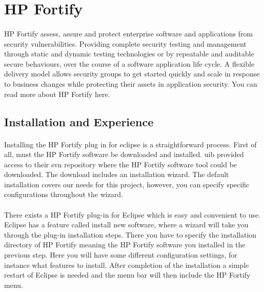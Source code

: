 \documentclass[11pt,english,a4paper]{report}
\begin{document}
\section{HP Fortify}
\paragraph{}
HP Fortify assess, assure and protect enterprise software and applications from security vulnerabilities.
Providing complete security testing and management through static and dynamic testing technologies or by repeatable and auditable secure behaviours, over the course of a software application life cycle. 
A flexible delivery model allows security groups to get started quickly and scale in response to business changes while protecting their assets in application security. 
You can read more about HP Fortify here. \cite{fortify-software-wiki, fortify-software-homepage-features} 

\subsection{Installation and Experience}
\paragraph{}
Installing the HP Fortify plug in for eclipse is a straightforward process. 
First of all, must the HP Fortify software be downloaded and installed.
\gls{uib} provided access to their \gls{svn} repository where the HP Fortify software tool could be downloaded.  
The download includes an installation wizard. 
The default installation covers our needs for this project, however, you can specify specific configurations throughout the wizard. \cite{installation-usage-guide}

\paragraph{}
There exists a HP Fortify plug-in for Eclipse which is easy and convenient to use.
Eclipse has a feature called install new software, where a wizard will take you through the plug-in installation steps.
There you have to specify the installation directory of HP Fortify meaning the HP Fortify software you installed in the previous step.
Here you will have some different configuration settings, for instance what features to install.
After completion of the installation a simple restart of Eclipse is needed and the menu bar will then include the HP Fortify menu. \cite{installation-usage-guide}
\end{document}
